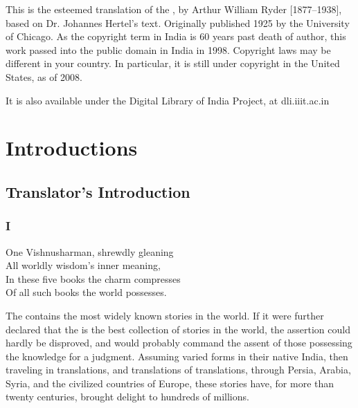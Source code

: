 



This is the esteemed translation of the , by Arthur
William Ryder [1877--1938], based on Dr. Johannes Hertel's text.  Originally
published 1925 by the University of Chicago.  As the copyright term in
India is 60 years past death of author, this work passed into the
public domain in India in 1998.  Copyright laws may be different in
your country.  In particular, it is still under copyright in the
United States, as of 2008.

It is also available under the Digital Library of India Project, at
dli.iiit.ac.in


\newpage

\part{Introductions}

\chapter{Translator's Introduction}

\section{I}

\begin{pverse}
One Vishnusharman, shrewdly gleaning\\
  All worldly wisdom's inner meaning,\\
In these five books the charm compresses\\
  Of all such books the world possesses.\\
\end{pverse}

The  contains the most widely known stories in the
world. If it were further declared that the  is the
best collection of stories in the world, the assertion could hardly be
disproved, and would probably command the assent of those possessing
the knowledge for a judgment. Assuming varied forms in their native
India, then traveling in translations, and translations of
translations, through Persia, Arabia, Syria, and the civilized
countries of Europe, these stories have, for more than twenty
centuries, brought delight to hundreds of millions.

